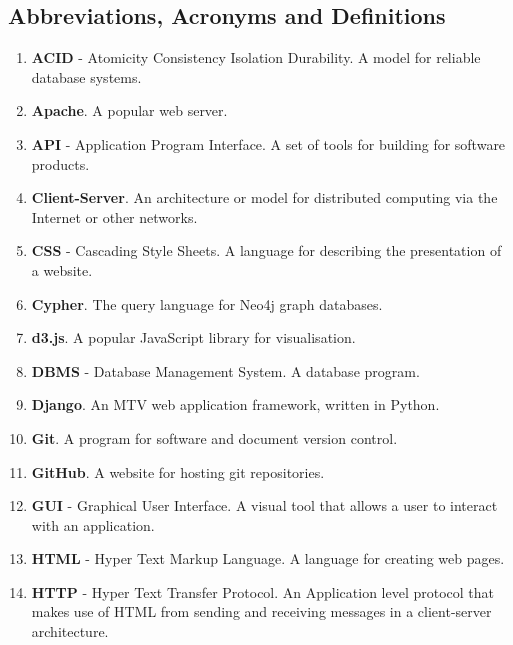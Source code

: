 \documentclass[12pt,onecolumn]{article}
\begin{document}
	\subsection{Abbreviations, Acronyms and Definitions} %
	
	\begin{enumerate}
		\item \textbf{ACID} - Atomicity Consistency Isolation Durability. A model for reliable database systems.
		
		\item \textbf{Apache}. A popular web server.
		
		\item \textbf{API} - Application Program Interface. A set of tools for building for software products.
		
		\item \textbf{Client-Server}. An architecture or model for distributed computing via the Internet or other networks.
		
		\item \textbf{CSS} - Cascading Style Sheets. A language for describing the presentation of a website.
		
		\item \textbf{Cypher}. The query language for Neo4j graph databases.
		
		\item \textbf{d3.js}. A popular JavaScript library for visualisation.
		
		\item \textbf{DBMS} - Database Management System. A database program.
		
		\item \textbf{Django}. An MTV web application framework, written in Python.
		
		\item \textbf{Git}. A program for software and document version control.
		
		\item \textbf{GitHub}. A website for hosting git repositories.
		
		\item \textbf{GUI} - Graphical User Interface. A visual tool that allows a user to interact with an application.
		
		\item \textbf{HTML} - Hyper Text Markup Language. A language for creating web pages.
		
		\item \textbf{HTTP} - Hyper Text Transfer Protocol. An Application level protocol that makes use of HTML from sending and receiving messages in a client-server architecture.
		

\end{enumerate}
\end{document}
